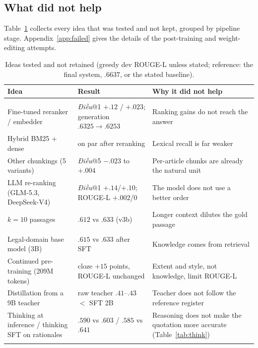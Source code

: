 \documentclass[11pt,a4paper]{article}
\newcommand{\rl}{ROUGE-L}
\newcommand{\dieu}{\textit{Điều}}
\begin{document}
\subsection{What did not help}\label{sec:negative}
Table~\ref{tab:neg} collects every idea that was tested and not kept, grouped by pipeline stage. Appendix~\ref{app:failed} gives the details of the post-training and weight-editing attempts.
\begin{table}[H]
\centering
\caption{Ideas tested and not retained (greedy dev \rl{} unless stated; reference: the final system, $.6637$, or the stated baseline).}\label{tab:neg}
\small\setlength{\tabcolsep}{4pt}
\begin{tabular}{@{}>{\raggedright\arraybackslash}p{5.2cm}>{\raggedright\arraybackslash}p{4.4cm}>{\raggedright\arraybackslash}p{5.6cm}@{}}
\toprule
Idea & Result & Why it did not help\\
\midrule
\multicolumn{3}{@{}l}{\emph{Retrieval}}\\
Fine-tuned reranker / embedder & \dieu{}@1 $+.12$ / $+.023$; generation $.6325\to.6253$ & Ranking gains do not reach the answer\\
Hybrid BM25 + dense & on par after reranking & Lexical recall is far weaker\\
Other chunkings (5 variants) & \dieu{}@5 $-.023$ to $+.004$ & Per-article chunks are already the natural unit\\
LLM re-ranking (GLM-5.3, DeepSeek-V4) & \dieu{}@1 $+.14$/$+.10$; \rl{} $+.002$/$0$ & The model does not use a better order\\
$k{=}10$ passages & $.612$ vs $.633$ (v3b) & Longer context dilutes the gold passage\\
\midrule
\multicolumn{3}{@{}l}{\emph{Generator}}\\
Legal-domain base model (3B) & $.615$ vs $.633$ after SFT & Knowledge comes from retrieval\\
Continued pre-training (209M tokens) & cloze $+15$ points, \rl{} unchanged & Extent and style, not knowledge, limit \rl{}\\
Distillation \cite{hinton} from a 9B teacher & raw teacher $.41$--$.43$ $<$ SFT 2B & Teacher does not follow the reference register\\
Thinking at inference / thinking SFT on rationales & $.590$ vs $.603$ / $.585$ vs $.641$ & Reasoning does not make the quotation more accurate (Table~\ref{tab:think})\\
\midrule
\multicolumn{3}{@{}l}{\emph{Post-training}}\\

\end{tabular}
\end{table}
\end{document}
